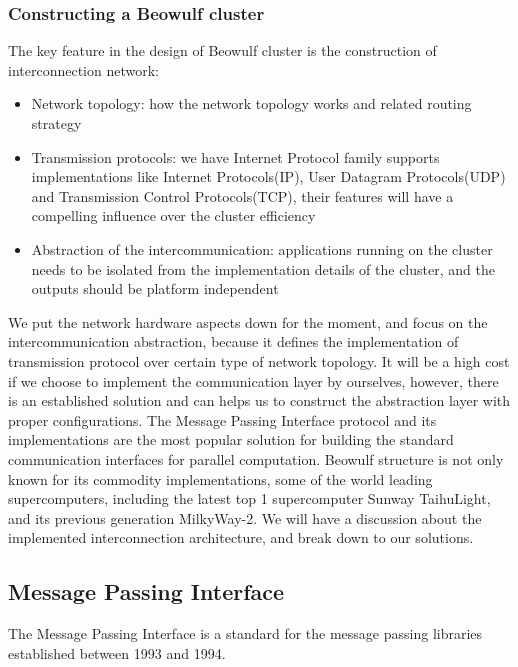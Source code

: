 \documentclass[11pt,openright,a4paper]{report}
\begin{document}
\subsubsection{Constructing a Beowulf cluster}
The key feature in the design of Beowulf cluster is the construction of interconnection network:
\begin{itemize}
	\item Network topology: how the network topology works and related routing strategy
	\item Transmission protocols: we have Internet Protocol family supports implementations like Internet Protocols(IP), User Datagram Protocols(UDP) and Transmission Control Protocols(TCP), their features will have a compelling influence over the cluster efficiency
	\item Abstraction of the intercommunication: applications running on the cluster needs to be isolated from the implementation details of the cluster, and the outputs should be platform independent
\end{itemize}
We put the network hardware aspects down for the moment, and focus on the intercommunication abstraction, because it defines the implementation of transmission protocol over certain type of network topology. It will be a high cost if we choose to implement the communication layer by ourselves, however, there is an established solution and can helps us to construct the abstraction layer with proper configurations. The Message Passing Interface protocol and its implementations are the most popular solution for building the standard communication interfaces for parallel computation\cite{geist1996mpi}.
Beowulf structure is not only known for its commodity implementations, some of the world leading supercomputers, including the latest top 1 supercomputer Sunway TaihuLight\cite{fu2016sunway}, and its previous generation MilkyWay-2\cite{liao2014milkyway}. We will have a discussion about the implemented interconnection architecture, and break down to our solutions.
\subsection{Message Passing Interface}
The Message Passing Interface is a standard for the message passing libraries established between 1993 and 1994\cite{geist1996mpi}.
\end{document}
